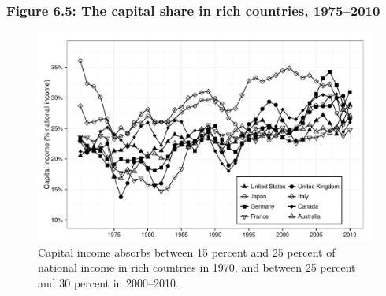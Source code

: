 \documentclass[t]{beamer}\usepackage[]{graphicx}\usepackage[]{color}
\newenvironment{knitrout}{}{} %
\begin{document}
\begin{frame}[label=Figure_6_5]
\frametitle{Figure 6.5: The capital share in rich countries, 1975--2010}
\begin{figure}[t]
\begin{minipage}[b]{\textwidth}
\centering
\begin{knitrout}\footnotesize
{}\color{fgcolor}

{\centering \includegraphics[width=1\linewidth]{figures/bw/Figure_6_5} 

}



\end{knitrout}
\caption{Capital income absorbs between 15 percent and 25 percent of national income in rich countries in 1970, and between 25 percent and 30 percent in 2000--2010.}
\end{minipage}
\end{figure}
\end{frame}
\end{document}
